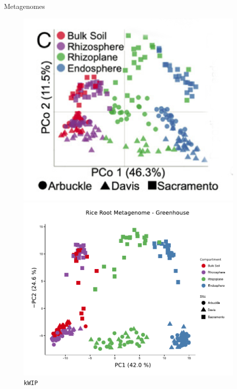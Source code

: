 \documentclass[t]{beamer}
\begin{document}
\begin{frame}{Metagenomes}
    \begin{figure}
        \centering
        \begin{minipage}{.5\textwidth}
            \centering
            \includegraphics[width=\textwidth]{img/greenhouse_edwards.png}
            \caption{\textcite{edwards_structure_2015}}
        \end{minipage}%
        \begin{minipage}{.5\textwidth}
            \centering
            \includegraphics[width=\textwidth]{img/greenhouse_nw.pdf}
            \caption{ \texttt{kWIP}}
        \end{minipage}
    \end{figure}
\end{frame}
\end{document}
